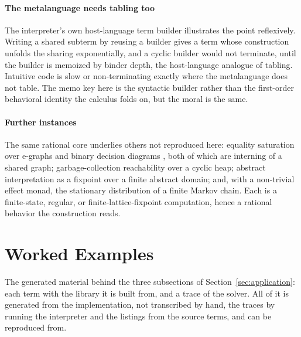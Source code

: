 \paragraph{The metalanguage needs tabling too}
The interpreter's own host-language term builder illustrates the point reflexively. Writing a shared subterm by reusing a builder gives a term whose construction unfolds the sharing exponentially, and a cyclic builder would not terminate, until the builder is memoized by binder depth, the host-language analogue of tabling. Intuitive code is slow or non-terminating exactly where the metalanguage does not table. The memo key here is the syntactic builder rather than the first-order behavioral identity the calculus folds on, but the moral is the same.

\paragraph{Further instances}
The same rational core underlies others not reproduced here: equality saturation over e-graphs
\cite{willsey2021-egg, zhang2023-egglog} and binary decision diagrams \cite{bryant1986-bdd}, both of which are interning of a shared graph; garbage-collection reachability over a cyclic heap; abstract interpretation as a fixpoint over a finite abstract domain; and, with a non-trivial effect monad, the stationary distribution of a finite Markov chain. Each is a finite-state, regular, or finite-lattice-fixpoint computation, hence a rational behavior the construction reads.

\section{Worked Examples}\label{app:examples}
The generated material behind the three subsections of Section~\ref{sec:application}: each term with the library it is built from, and a trace of the solver. All of it is generated from the implementation, not transcribed by hand, the traces by running the interpreter and the listings from the source terms, and can be reproduced from.

